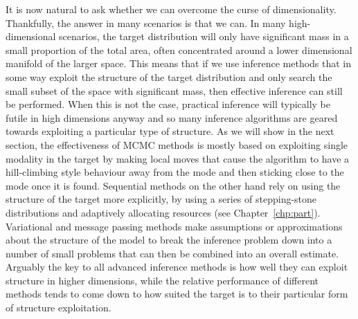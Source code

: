 It is now natural to ask whether we can overcome the curse of dimensionality.  Thankfully, the
answer in many scenarios is that we can.  In many high-dimensional scenarios, the target
distribution will only have significant mass in a small proportion of the total area, often
concentrated around a lower dimensional manifold of the larger space.  This means that if
we use inference methods that in some way exploit the structure of the target distribution and only
search the small subset of the space with significant mass, then effective inference can still be
performed.  When this is not the case, practical inference will typically be futile in high dimensions anyway
and so many inference algorithms are geared towards exploiting a particular type of structure.
As we will show in the next section, the effectiveness of MCMC methods is mostly based on 
exploiting single modality in the target by making local moves that cause the algorithm to have a
hill-climbing style behaviour away from the mode and then sticking close to the mode once it
is found.  Sequential \mc methods on the other hand rely on using the structure of the target
more explicitly, by using a series of stepping-stone distributions and adaptively allocating
resources (see Chapter~\ref{chp:part}).  Variational and message passing methods make assumptions
or approximations about the structure of the model to break the inference problem down
into a number of small problems that can then be combined into an overall estimate.
Arguably the key to all advanced inference methods is how well they can exploit structure
in higher dimensions, while the relative performance of different methods tends to come down
to how suited the target is to their particular form of structure exploitation.